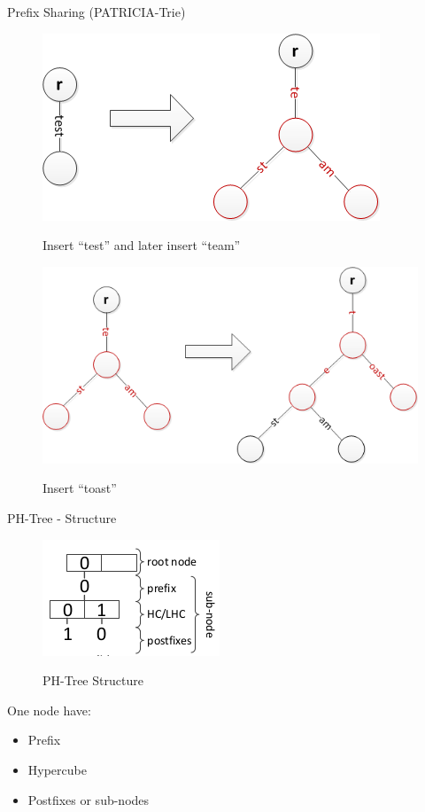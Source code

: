 \documentclass{beamer}
\begin{document}
\begin{frame}{Prefix Sharing (PATRICIA-Trie)}
 \begin{figure}[h]
  \centering
  \includegraphics[scale = 0.3]{2.png}
  \label{fig2}
  \caption{Insert ``test'' and later insert ``team''}
 \end{figure}

 \begin{figure}[h]
  \centering
  \includegraphics[scale = 0.3]{3.png}
  \label{fig3}
  \caption{Insert ``toast''}
 \end{figure}
\end{frame}


\begin{frame}{PH-Tree - Structure}
   \begin{figure}[h]
    \centering
    \includegraphics[scale=0.5]{1.png}
    \label{fig1}
    \caption{PH-Tree Structure}
  \end{figure}
  \begin{block}{One node have:}
    \begin{itemize}
     \item Prefix
     \item Hypercube
     \item Postfixes or sub-nodes
    \end{itemize}
  \end{block}

\end{frame}
\end{document}
